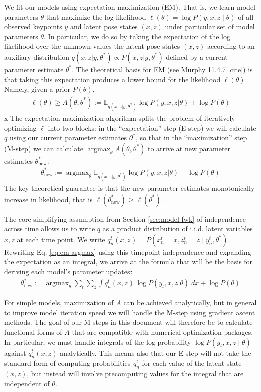 \documentclass{article}         %
\DeclareMathOperator{\argmax}{\arg\max}
\newcommand{\EE}{\mathbb{E}}
\begin{document}
We fit our models using expectation maximization (EM). That is, we learn model parameters $\theta$ that maximize the log likelihood $\ell(\theta) = \log P(y, x, z\mid \theta)$ of all observed keypoints $y$ and latent pose states $(x, z)$ under particular set of model parameters $\theta$. In particular, we do so by taking the expectation of the log likelihood over the unknown values the latent pose states $(x, z)$ according to an auxiliary distribution $q(x, z | y, \theta^*) \propto P(x, z | y, \theta^*)$ defined by a current parameter estimate $\theta^*$. The theoretical basis for EM (see Murphy 11.4.7 [cite]) is that taking this expectation produces a lower bound for the likelihood $\ell(\theta)$. Namely, given a prior $P(\theta)$,
\begin{align}
    \ell(\theta) \geq A(\theta, \theta^*) := \EE_{q(x, z | y, \theta^*)} \log P(y, x, z | \theta) + \log P(\theta)
    \label{eq:A-defn}
\end{align}x
The expectation maximization algorithm splits the problem of iteratively optimizing $\ell$ into two blocks: in the ``expectation'' step (E-step) we will calculate $q$ using our current parameter estimates $\theta^*$, so that in the ``maximization'' step (M-step) we can calculate $\argmax_\theta A(\theta, \theta^*)$ to arrive at new parameter estimates $\theta^*_{\text{new}}$:
\begin{align}
    \theta^*_{\text{new}} := \argmax_{\theta} \EE_{q(x, z | y, \theta^*)} \log P(y, x, z | \theta) + \log P(\theta)\label{eq:em-argmax}
\end{align}
The key theoretical guarantee is that the new parameter estimates monotonically increase in likelihood, that is $\ell(\theta^*_{\text{new}}) \geq \ell(\theta^*)$.

The core simplifying assumption from Section \ref{sec:model-fwk} of independence across time allows us to write $q$ as a product distribution of i.i.d. latent variables $x, z$ at each time point. We write $q_n^t(x, z) = P(x_n^t = x, z_n^t = z \mid y_n^t, \theta^*)$. Rewriting Eq. \ref{eq:em-argmax} using this timepoint independence and expanding the expectation as an integral, we arrive at the formula that will be the basis for deriving each model's parameter updates:
\begin{align}
    \theta^*_{\text{new}} := \argmax_{\theta} \sum_t \sum_{z} \int q_n^t(x, z)\, \log P(y_t, x, z | \theta) \; dx + \log P(\theta)\label{eq:em-int-argmax}
\end{align}

For simple models, maximization of $A$ can be achieved analytically, but in general to improve model iteration speed we will handle the M-step using gradient ascent methods. The goal of our M-steps in this document will therefore be to calculate functional forms of $A$ that are compatible with numerical optimization packages. In particular, we must handle integrals of the log probability $\log P(y_t, x, z\mid \theta)$ against $q_n^t(x, z)$ analytically. This means also that our E-step will not take the standard form of computing probabilities $q_n^t$ for each value of the latent state $(x, z)$, but instead will involve precomputing values for the integral that are independent of $\theta$.
\end{document}
